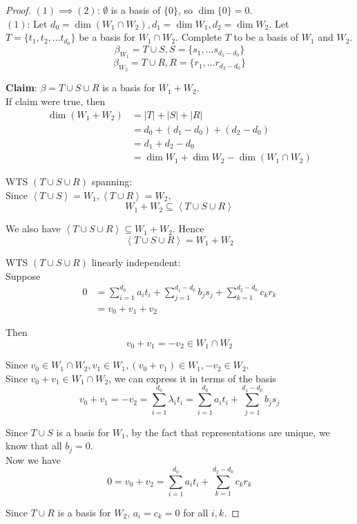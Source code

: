 \begin{proof}
\newline
$(1) \implies (2)$: $\emptyset$ is a basis of $\{ 0 \} $, so $\dim \{ 0 \} = 0$. \\

$(1)$: Let $d_0 = \dim (W_1 \cap W_2), d_1 = \dim W_1, d_2 = \dim W_2$. Let $T = \{ t_1, t_2, \hdots t_{d_0} \} $ be a basis for $W_1 \cap W_2$. Complete $T$ to be a basis of $W_1$ and $W_2$. 
\[
  \beta_{W_1} = T \cup S, S = \{ s_1, \hdots s_{d_1 - d_0} \} 
\]
\[
  \beta_{W_2} = T \cup R, R = \{ r_1, \hdots r_{d_2 - d_0} \} 
\]

\textbf{Claim}: $\beta = T \cup S \cup R$ is a basis for $W_1 + W_2$. \\

If claim were true, then 
\begin{align*}
  \dim (W_1 + W_2) &= |T| + |S| + |R|  \\
  &= d_0 + (d_1 - d_0) + (d_2 - d_0) \\
  &= d_1 + d_2 - d_0 \\
  &= \dim W_1 + \dim W_2 - \dim (W_1 \cap W_2)
\end{align*}

WTS $(T \cup S \cup R)$ spanning: \\

Since $ \left< T \cup S\right> = W_1, \left< T \cup R \right> = W_2$, 
\[
  W_1 + W_2 \subseteq \left< T \cup S \cup R \right>
\]

We also have $\left< T \cup S \cup R\right> \subseteq W_1 + W_2$. Hence 
\[
  \left< T \cup S \cup R\right> = W_1 + W_2
\]

WTS $(T \cup S \cup R)$ linearly independent: \\

Suppose 
\begin{align*}
    0 &= \sum\limits_{i = 1}^{d_0} a_i t_i + \sum\limits_{j = 1}^{d_1 - d_0} b_j s_j + \sum\limits_{k = 1}^{d_2 - d_0} c_k r_k \\
    &= v_0 + v_1 + v_2 
\end{align*}

Then 
\[
  v_0 + v_1 = -v_2 \in W_1 \cap W_2
\]

Since $v_0 \in W_1 \cap W_2, v_1 \in W_1, (v_0 + v_1) \in W_1, -v_2 \in W_2$. \\

Since $v_0 + v_1 \in W_1 \cap W_2$, we can express it in terms of the basis
\[
  v_0 + v_1 = -v_2 = \sum\limits_{ i = 1}^{d_0}  \lambda_i t_i = \sum\limits_{i = 1}^{d_0}  a_i t_i + \sum\limits_{j = 1}^{d_1 - d_0}  b_j s_j
\]

Since $T \cup S$ is a basis for $W_1$, by the fact that representations are unique, we know that all $b_j = 0$. \\

Now we have 
\[
   0 = v_0 + v_2 = \sum\limits_{i = 1}^{d_0} a_i t_i + \sum\limits_{k = 1}^{d_2 - d_0}  c_k r_k
\]

Since $T \cup R$ is a basis for $W_2$, $a_i = c_k = 0$  for all $i, k$.
\end{proof}

\newpage











